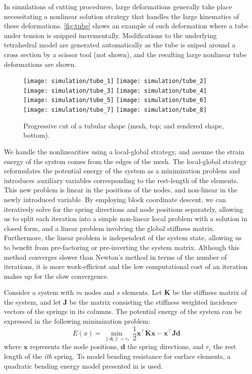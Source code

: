 In simulations of cutting procedures, large deformations generally take place necessitating a nonlinear solution strategy that handles the large kinematics of these deformations. \autoref{fig:tube} shows an example of such deformation where a tube under tension is snipped incrementally. Modifications to the underlying tetrahedral model are generated automatically as the tube is sniped around a cross section by a scissor tool (not shown), and the resulting large nonlinear tube deformations are shown.

\begin{figure}
  \centering%
	\texttt{[image: simulation/tube\_1]}\hfill%
	\texttt{[image: simulation/tube\_2]}\hfill%
	\texttt{[image: simulation/tube\_3]}\hfill%
	\texttt{[image: simulation/tube\_4]}\\

  \centering%
	\texttt{[image: simulation/tube\_5]}\hfill%
	\texttt{[image: simulation/tube\_6]}\hfill%
	\texttt{[image: simulation/tube\_7]}\hfill%
	\texttt{[image: simulation/tube\_8]}\\
	\caption{Progressive cut of a tubular shape (mesh, top; and rendered shape, bottom).}\label{fig:tube}
\end{figure}

We handle the nonlinearities using a local-global strategy, and assume the strain energy of the system
comes from the edges of the mesh. The local-global strategy reformulates the potential energy 
of the system as a minimization problem and introduces auxiliary variables
corresponding to the rest-length of the elements. This new problem is linear in the 
positions of the nodes, and non-linear in the newly introduced variable. 
By employing block coordinate descent, we can iteratively solve for the spring 
directions and node positions separately, allowing us to split each iteration 
into a simple non-linear local problem with a solution in closed form, and a
linear problem involving the global stiffness matrix. Furthermore, the linear problem is independent of the system
state, allowing us to benefit from pre-factoring or pre-inverting the system matrix.
Although this method converges slower than Newton's method in terms of the
number of iterations, it is more work-efficient and the low 
computational cost of an iteration makes up for the slow convergence.

Consider a system with $m$ nodes and $s$ elements. Let $\mathbf{K}$ be the stiffness 
matrix of the system, and let $\mathbf{J}$ be the matrix consisting 
the stiffness weighted incidence vectors of the springs in its columns. 
The potential energy of the system can be expressed in the following minimization 
problem:
\begin{equation}
  E(x) = \min_{\|\mathbf{d}_i\| = r_i} \ 
  \frac{1}{2}\mathbf{x}^\intercal\mathbf{Kx} -
  \mathbf{x}^\intercal\mathbf{Jd}
\end{equation}
where $\mathbf{x}$ represents the node positions, $\mathbf{d}$ the spring 
directions, and $r_i$ the rest length of the \textit{ith} spring. To model
bending resistance for surface elements, a quadratic bending 
energy model presented in \cite{Bergou06} is used. 

